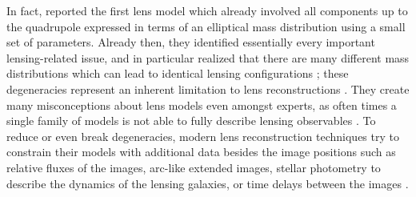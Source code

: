 In fact,  reported the first lens model which already
involved all components up to the quadrupole expressed in terms of an elliptical
mass distribution using a small set of parameters.  Already then, they
identified essentially every important lensing-related issue, and in particular
realized that there are many different mass distributions which can lead to
identical lensing configurations ; these degeneracies
represent an inherent limitation to lens reconstructions .
They create many misconceptions about lens models even amongst experts, as often
times a single family of models is not able to fully describe lensing
observables .  To reduce or
even break degeneracies, modern lens reconstruction techniques try to constrain
their models with additional data besides the image positions such as relative
fluxes of the images, arc-like extended images, stellar photometry to describe
the dynamics of the lensing galaxies, or time delays between the images
.
